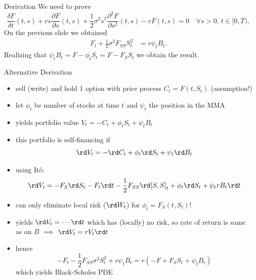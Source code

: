 \documentclass[pdf, handout]{beamer}
\begin{document}
\begin{frame}{Derivation}
We need to prove
\[
\frac{\delta F}{\delta t}(t,s) + r s \frac{\partial F}{\partial
s}(t,s) + \frac{1}{2}\sigma^2 s^2 \frac{\partial^2 F}{\partial
s^2}(t,s) -r F(t,s)=0\quad \forall s>0,\,t\in[0, T),
\]
On the previous slide we obtained
\begin{align*}
F_t + \frac{1}{2}\sigma^2 F_{SS} S_t^2    
&=  r\psi_t B_t.
\end{align*}
Realizing that $\psi_t B_t = F - \phi_t S_t = F - F_S S_t$
we obtain the result.
\end{frame}



\begin{frame}{Alternative Derivation}
\begin{itemize}
\item sell (write) and hold 1 option with price process
$C_t = F(t, S_t)$  (assumption!)
\item let $\phi_t$ be number of stocks at time $t$ and $\psi_t$ the position in the MMA 
\item yields portfolio value $V_t =  - C_t + \phi_t S_t + \psi_t B_t$
\item this portfolio is self-financing if
\[
\rd V_t =  - \rd C_t  + \phi_t \rd S_t + \psi_t \rd B_t
\]
\item 
using It\^o:
\[
\rd V_t = - F_S \rd S_t - F_t \rd t - \frac{1}{2}F_{SS} \rd [S,S]_t + \phi_t \rd S_t
+ \psi_t r B_t \rd t
\]
\item can only eliminate local risk ($\rd W_t$) for $\phi_t = F_S(t, S_t)$!
\item yields $\rd V_t = \cdots \rd t$  which has (locally) no risk, so
rate of return is same as on $B$ $\implies$ $\rd V_t =r V_t \rd t$
\item hence 
\[
-F_t - \frac{1}{2}F_{SS}\sigma^2 S_t^2 + r\psi_t B_t = r \left(  - F  + F_S S_t + \psi_t B_t
\right)
\]
which yields Black-Scholes PDE
\end{itemize}

\end{frame}
\end{document}
